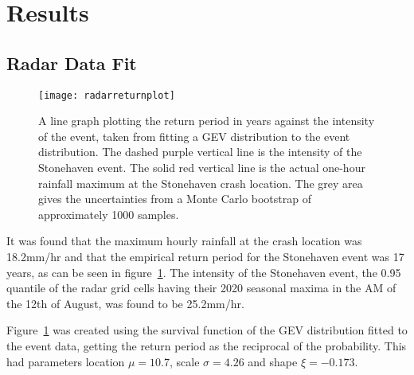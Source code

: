 \section{Results}\label{sec:results}

\begin{comment}
This section should detail the obtained results in a clear,
easy-to-follow manner. It is important to make clear what are original
results and what are repeats of previous calculations or computations.
Remember that long tables of numbers are just as boring to read as
they are to type-in!

Use graphs to present your results wherever practicable.

Results or computations should be presented with uncertainties
(errors), both statistical and systematic where applicable.

Be selective in what you include: half a dozen \emph{e.g.}~tables that
contain wrong data you collected while you forgot to switch on the
computer are not relevant and may mask the correct results.
\end{comment}

\subsection{Radar Data Fit}\label{subsec:radardatafit}

\begin{figure}[H]
    \centering
    \texttt{[image: radarreturnplot]}
    \caption{A line graph plotting the return period in years against the intensity of the event,
        taken from fitting a GEV distribution to the event distribution.
    The dashed purple vertical line is the intensity of the Stonehaven event.
    The solid red vertical line is the actual one-hour rainfall maximum at the Stonehaven crash location.
    The grey area gives the uncertainties from a Monte Carlo bootstrap of approximately 1000 samples.}
    \label{fig:radarreturnplot}
\end{figure}

It was found that the maximum hourly rainfall at the crash location was 18.2mm/hr and
    that the empirical return period for the Stonehaven event was 17 years,
    as can be seen in figure~\ref{fig:radarreturnplot}.
The intensity of the Stonehaven event,
    the 0.95 quantile of the radar grid cells having their 2020 seasonal maxima in the AM of the 12th of August,
    was found to be 25.2mm/hr.

Figure~\ref{fig:radarreturnplot} was created using the survival function of the GEV distribution fitted to the event data,
    getting the return period as the reciprocal of the probability.
This had parameters location $\mu = 10.7$, scale $\sigma = 4.26$ and shape $\xi = -0.173$.

